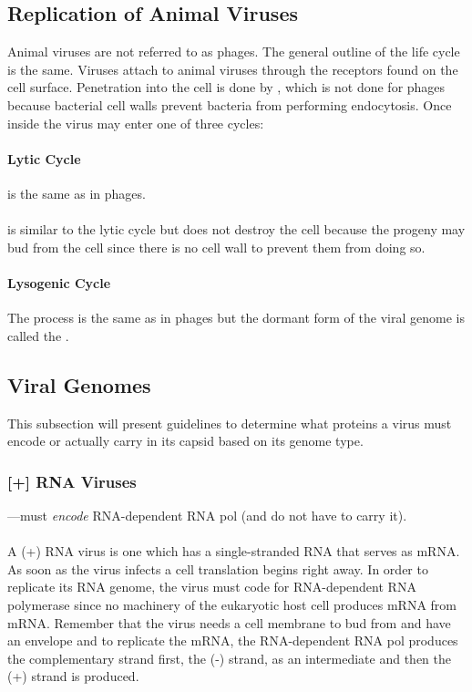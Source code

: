 \documentclass[../Bio_chemistryReview.tex]{subfiles}
\begin{document}
\subsection{Replication of Animal Viruses}
Animal viruses are not referred to as phages. The general outline of the life
cycle is the same. Viruses attach to animal viruses through the receptors found
on the cell surface. Penetration into the cell is done by ,
which is not done for phages because bacterial cell walls prevent bacteria from
performing endocytosis. Once inside the virus may enter one of three cycles:
\paragraph{Lytic Cycle} is the same as in phages.
\paragraph{} is similar to the lytic cycle but does not
destroy the cell because the progeny may bud from the cell since there is no
cell wall to prevent them from doing so.
\paragraph{Lysogenic Cycle} The process is the same as in phages but the dormant
form of the viral genome is called the .
\newpage
\subsection{Viral Genomes}
This subsection will present guidelines to determine what proteins a virus must
encode or actually carry in its capsid based on its genome type.

\subsubsection{[+] RNA Viruses}
---must \textit{encode} RNA-dependent RNA pol (and do not have to carry it).\\
\hfil\\
\noindent A (+) RNA virus is one which has a single-stranded RNA that serves as
mRNA. As soon as the virus infects a cell translation begins right away. In
order to replicate its RNA genome, the virus must code for RNA-dependent RNA
polymerase since no machinery of the eukaryotic host cell produces mRNA from
mRNA. Remember that the virus needs a cell membrane to bud from and have an
envelope and to replicate the mRNA, the RNA-dependent RNA pol produces the
complementary strand first, the (-) strand, as an intermediate and then the
(+) strand is produced.
\end{document}
